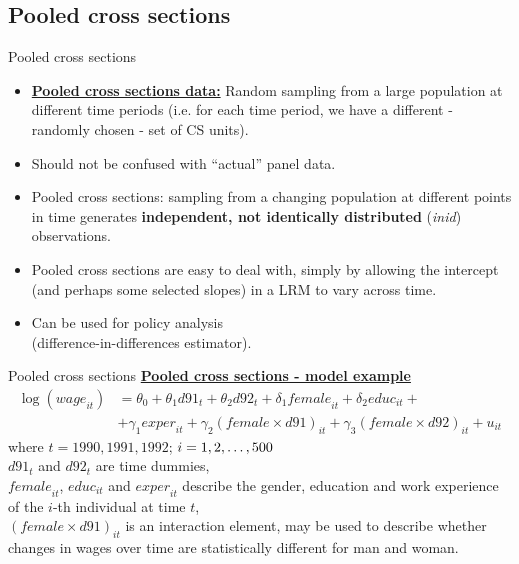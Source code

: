 \documentclass[usenames,dvipsnames]{beamer}
\newcommand{\mytikzmark}[2]{%
  \tikz[remember picture,inner sep=0pt,outer sep=0pt,baseline,anchor=base] 
    \node (#1) {\ensuremath{#2}};}
\begin{document}
\subsection*{Pooled cross sections}
\begin{frame}{Pooled cross sections}
\begin{itemize}
\item \underline{\textbf{Pooled cross sections data:}}
Random sampling from a large population at different time periods (i.e. for each time period, we have a different - randomly chosen - set of CS units). 
\medskip
\item Should not be confused with ``actual'' panel data. 
\medskip
\item Pooled cross sections: sampling from a changing population at different points in time generates \textbf{independent, not identically distributed} (\textit{inid}) observations. 
\medskip
\item Pooled cross sections are easy to deal with, simply by allowing the intercept (and perhaps some selected slopes) in a LRM to vary across time. 
\medskip
\item Can be used for policy analysis \\(difference-in-differences estimator). 
\end{itemize}
\end{frame}
\begin{frame}{Pooled cross sections}
\underline{\textbf{Pooled cross sections - model example}}
\begin{align*}
\log(\textit{wage}_{it}) & = \theta_0 + \theta_1 d91_t + \theta_2 d92_t + \delta_1 \textit{female}_{it} + \delta_2 \textit{educ}_{it} +\\
& + \gamma_1 \textit{exper}_{it} + \gamma_2 (\textit{female} \times d91)_{it} + \gamma_3 (\textit{female} \times d92)_{it} + u_{it} 
\end{align*}
\medskip
where $t = 1990, 1991, 1992$; \hspace{0.2cm} $i=1,2, \dots , \mytikzmark{500}{500}$ \\
$d91_{t}$ and $d92_t$ are time dummies, \\
\vspace{0.2cm}
$\textit{female}_{it}$, $\textit{educ}_{it}$ and $\textit{exper}_{it}$ describe the gender, education and work experience of the $i$-th individual at time $t$, \\
\vspace{0.2cm}
$(\textit{female} \times d91)_{it}$ is an interaction element, may be used to describe whether changes in wages over time are statistically different for man and woman.
\end{frame}
\end{document}
